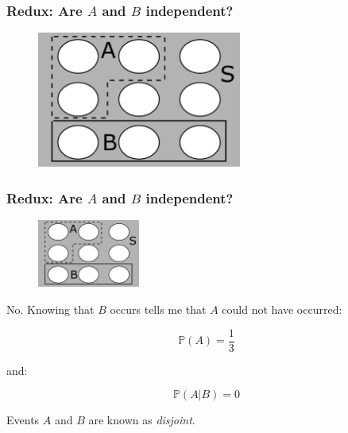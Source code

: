 \documentclass{beamer}
\begin{document}
	
	\begin{frame}
		\frametitle{Redux: Are $A$ and $B$ independent?}
		
		\begin{figure}[ht]
			\centerline{\includegraphics[width=0.6\textwidth]{./figures/pebble_world_prob_disjoint.pdf}}
		\end{figure}
		
	\end{frame}

		\begin{frame}
		\frametitle{Redux: Are $A$ and $B$ independent?}
		
		\begin{figure}[ht]
			\centerline{\includegraphics[width=0.3\textwidth]{./figures/pebble_world_prob_disjoint.pdf}}
		\end{figure}
	
	No. Knowing that $B$ occurs tells me that $A$ could not have occurred:
	
	\begin{equation}
		\mathbb{P}(A) =  \frac{1}{3}
	\end{equation}

	and:
	
	\begin{equation}
		\mathbb{P}(A|B) =  0
	\end{equation}

	Events $A$ and $B$ are known as \textit{disjoint}.
		
	\end{frame}
\end{document}
